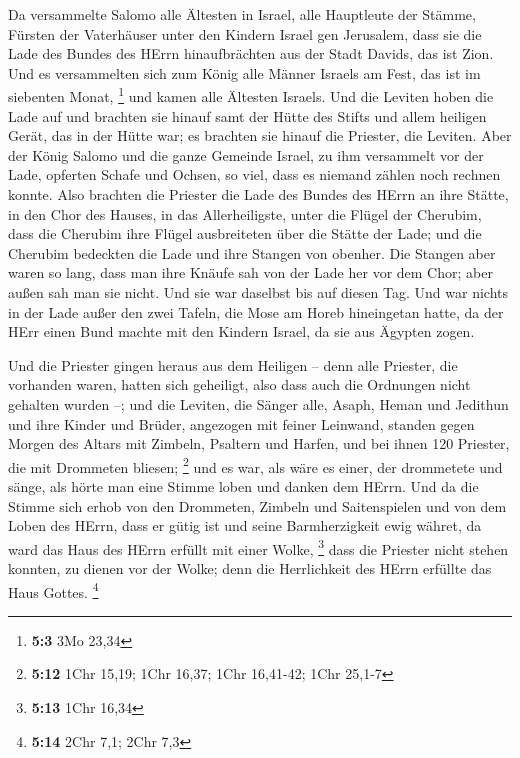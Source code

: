  Da versammelte Salomo alle Ältesten in Israel, alle
Hauptleute der Stämme, Fürsten der Vaterhäuser unter den Kindern Israel
gen Jerusalem, dass sie die Lade des Bundes des HErrn hinaufbrächten aus
der Stadt Davids, das ist Zion.  Und es versammelten sich
zum König alle Männer Israels am Fest, das ist im siebenten Monat,
\footnote{\textbf{5:3} 3Mo 23,34}  und kamen alle Ältesten
Israels. Und die Leviten hoben die Lade auf  und brachten
sie hinauf samt der Hütte des Stifts und allem heiligen Gerät, das in
der Hütte war; es brachten sie hinauf die Priester, die Leviten.
 Aber der König Salomo und die ganze Gemeinde Israel, zu ihm
versammelt vor der Lade, opferten Schafe und Ochsen, so viel, dass es
niemand zählen noch rechnen konnte.  Also brachten die
Priester die Lade des Bundes des HErrn an ihre Stätte, in den Chor des
Hauses, in das Allerheiligste, unter die Flügel der Cherubim,
 dass die Cherubim ihre Flügel ausbreiteten über die Stätte
der Lade; und die Cherubim bedeckten die Lade und ihre Stangen von
obenher.  Die Stangen aber waren so lang, dass man ihre
Knäufe sah von der Lade her vor dem Chor; aber außen sah man sie nicht.
Und sie war daselbst bis auf diesen Tag.  Und war nichts in
der Lade außer den zwei Tafeln, die Mose am Horeb hineingetan hatte, da
der HErr einen Bund machte mit den Kindern Israel, da sie aus Ägypten
zogen.

 Und die Priester gingen heraus aus dem Heiligen -- denn
alle Priester, die vorhanden waren, hatten sich geheiligt, also dass
auch die Ordnungen nicht gehalten wurden --;  und die
Leviten, die Sänger alle, Asaph, Heman und Jedithun und ihre Kinder und
Brüder, angezogen mit feiner Leinwand, standen gegen Morgen des Altars
mit Zimbeln, Psaltern und Harfen, und bei ihnen 120 Priester, die mit
Drommeten bliesen; \footnote{\textbf{5:12} 1Chr 15,19; 1Chr 16,37; 1Chr
  16,41-42; 1Chr 25,1-7}  und es war, als wäre es einer,
der drommetete und sänge, als hörte man eine Stimme loben und danken dem
HErrn. Und da die Stimme sich erhob von den Drommeten, Zimbeln und
Saitenspielen und von dem Loben des HErrn, dass er gütig ist und seine
Barmherzigkeit ewig währet, da ward das Haus des HErrn erfüllt mit einer
Wolke, \footnote{\textbf{5:13} 1Chr 16,34}  dass die
Priester nicht stehen konnten, zu dienen vor der Wolke; denn die
Herrlichkeit des HErrn erfüllte das Haus Gottes. \footnote{\textbf{5:14}
  2Chr 7,1; 2Chr 7,3}

